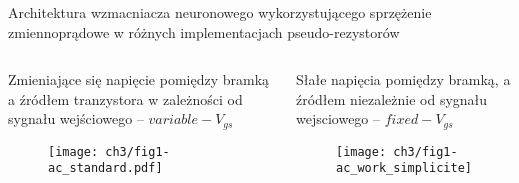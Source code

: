 



\begin{frame}{Architektura wzmacniacza neuronowego wykorzystującego sprzężenie zmiennoprądowe w różnych implementacjach pseudo-rezystorów}
    \begin{columns}[t]

        \vspace{-2em} %

        \begin{alertblock}{Zmieniające się napięcie  pomiędzy bramką a źródłem tranzystora w zależności od sygnału wejściowego -- $variable-V_{gs}$}
                 

            \begin{figure}[H]
                \centering
                \texttt{[image: ch3/fig1-ac\_standard.pdf]}
            \end{figure}
        \end{alertblock}



        \vspace{-2em} %

        \begin{exampleblock}{Słałe napięcia pomiędzy bramką, a źródłem niezależnie od sygnału wejsciowego -- $fixed-V_{gs}$}
            \begin{figure}[H]
                \centering
                \texttt{[image: ch3/fig1-ac\_work\_simplicite]}
            \end{figure}
        \end{exampleblock}

    \end{columns}
\end{frame}

